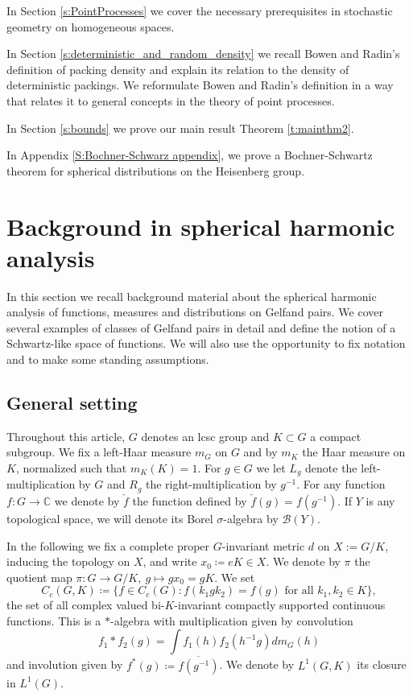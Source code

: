 \documentclass[12pt,reqno,a4paper]{amsart}
\theoremstyle{theorem}
\theoremstyle{definition}
\numberwithin{theorem}{section}
\numberwithin{equation}{section}
\newcommand{\C}{\mathbb{C}}
\begin{document}
In Section \ref{s:PointProcesses} we cover the necessary prerequisites in stochastic geometry on homogeneous spaces.

In Section \ref{s:deterministic_and_random_density} we recall Bowen and Radin's definition of packing density and explain its relation to the density of deterministic packings. We reformulate Bowen and Radin's definition in a way that relates it to general concepts in the theory of point processes.

In Section \ref{s:bounds} we prove our main result Theorem \ref{t:mainthm2}.

In Appendix \ref{S:Bochner-Schwarz appendix}, we prove a Bochner-Schwartz theorem for spherical distributions on the Heisenberg group.

\section{Background in spherical harmonic analysis}\label{s:harmonic_analysis}

In this section we recall background material about the spherical harmonic analysis of functions, measures and distributions on Gelfand pairs. We cover several examples of classes of Gelfand pairs in detail and define the notion of a Schwartz-like space of functions.
We will also use the opportunity to fix notation and to make some standing assumptions.
\subsection{General setting}\label{s:general assumptions}

Throughout this article, $G$ denotes an lcsc group and $K\subset G$ a compact subgroup. We fix a left-Haar measure $m_G$ on $G$ and by $m_K$ the Haar measure on $K$, normalized such that $m_K(K)=1$. 
For $g\in G$ we let $L_g$ denote the left-multiplication by $G$ and $R_g$ the right-multiplication by $g^{-1}$.
For any function $f:G\to \C$ we denote by $\check{f}$ the function defined by $\check{f}(g) = f(g^{-1})$.
If $Y$ is any topological space, we will denote its Borel $\sigma$-algebra by $\mathcal{B}(Y)$.

In the following we fix a complete proper $G$-invariant metric $d$ on $X := G/K$, inducing the topology on $X$, and write $x_0\coloneqq eK\in X$. We denote by $\pi$ the quotient map $\pi:G\to G/K,\ g\mapsto gx_0 = gK$.
We set
\[
C_c(G, K)\coloneqq \{f\in C_c(G) : f(k_1gk_2) = f(g)\text{ for all }k_1,k_2\in K\},
\]
the set of all complex valued bi-$K$-invariant compactly supported continuous functions.
This is a $*$-algebra with multiplication given by convolution 
\[f_1*f_2(g) = \int f_1(h)f_2(h^{-1}g)dm_G(h)\]
and involution given by $f^*(g)\coloneqq \overline{f(g^{-1})}$. 
We denote by $L^1(G, K)$ its closure in $L^1(G)$. 
\end{document}
